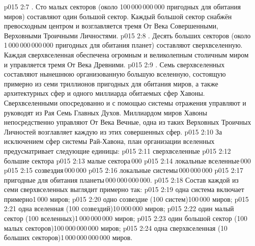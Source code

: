 \vs p015 2:7 . Сто малых секторов (около 100\,000\,000\,000 пригодных для обитания миров) составляют один большой сектор. Каждый большой сектор снабжён превосходным центром и возглавляется тремя От Века Совершенными, Верховными Троичными Личностями.
\vs p015 2:8 . Десять больших секторов (около 1\,000\,000\,000\,000 пригодных для обитания планет) составляют сверхвселенную. Каждая сверхвселенная обеспечена огромным и великолепным столичным миром и управляется тремя От Века Древними.
\vs p015 2:9 . Семь сверхвселенных составляют нынешнюю организованную большую вселенную, состоящую примерно из семи триллионов пригодных для обитания миров, а также архитектурных сфер и одного миллиарда обитаемых сфер Хавоны. Сверхвселенными опосредованно и с помощью системы отражения управляют и руководят из Рая Семь Главных Духов. Миллиардом миров Хавоны непосредственно управляют От Века Вечные, одна из таких Верховных Троичных Личностей возглавляет каждую из этих совершенных сфер.
\vs p015 2:10 \pc За исключением сфер системы Рай\hyp{}Хавона, план организации вселенных предусматривает следующие единицы:
\vs p015 2:11 сверхвселенные
\vs p015 2:12 большие сектора
\vs p015 2:13 малые сектора\,000
\vs p015 2:14 локальные вселенные\,000
\vs p015 2:15 созвездия\,000\,000
\vs p015 2:16 локальные системы\,000\,000\,000
\vs p015 2:17 пригодные для обитания планеты\,000\,000\,000\,000.
\vs p015 2:18 Состав каждой из семи сверхвселенных выглядит примерно так:
\vs p015 2:19 одна система включает примерно\hfill1\,000 миров;
\vs p015 2:20 одно созвездие (100 систем)\hfill100\,000 миров;
\vs p015 2:21 одна вселенная (100 созвездий)\hfill10\,000\,000 миров;
\vs p015 2:22 один малый сектор (100 вселенных)\hfill1\,000\,000\,000 миров;
\vs p015 2:23 один большой сектор (100 малых секторов)\hfill100\,000\,000\,000 миров;
\vs p015 2:24 одна сверхвселенная (10 больших секторов)\hfill1\,000\,000\,000\,000 миров.

